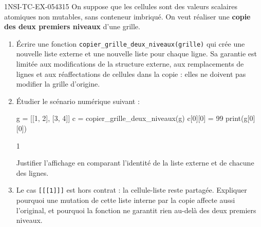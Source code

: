 \begin{exercice}{1NSI-TC-EX-054}{3}{15}
On suppose que les cellules sont des valeurs scalaires atomiques non mutables,
sans conteneur imbriqué. On veut réaliser une \textbf{copie des deux premiers
niveaux} d'une grille.

\begin{enumerate}
  \item Écrire une fonction \lstinline{copier_grille_deux_niveaux(grille)} qui
        crée une nouvelle liste externe et une nouvelle liste pour chaque ligne.
        Sa garantie est limitée aux modifications de la structure externe, aux
        remplacements de lignes et aux réaffectations de cellules dans la copie :
        elles ne doivent pas modifier la grille d'origine.
  \item Étudier le scénario numérique suivant :
\begin{python}
g = [[1, 2], [3, 4]]
c = copier_grille_deux_niveaux(g)
c[0][0] = 99
print(g[0][0])
\end{python}
\begin{console}
1
\end{console}
        Justifier l'affichage en comparant l'identité de la liste externe et de
        chacune des lignes.
  \item Le cas \lstinline{[[[1]]]} est hors contrat : la cellule-liste reste partagée.
        Expliquer pourquoi une mutation de cette liste interne par la copie affecte
        aussi l'original, et pourquoi la fonction ne garantit rien au-delà des deux
        premiers niveaux.
\end{enumerate}
\end{exercice}
